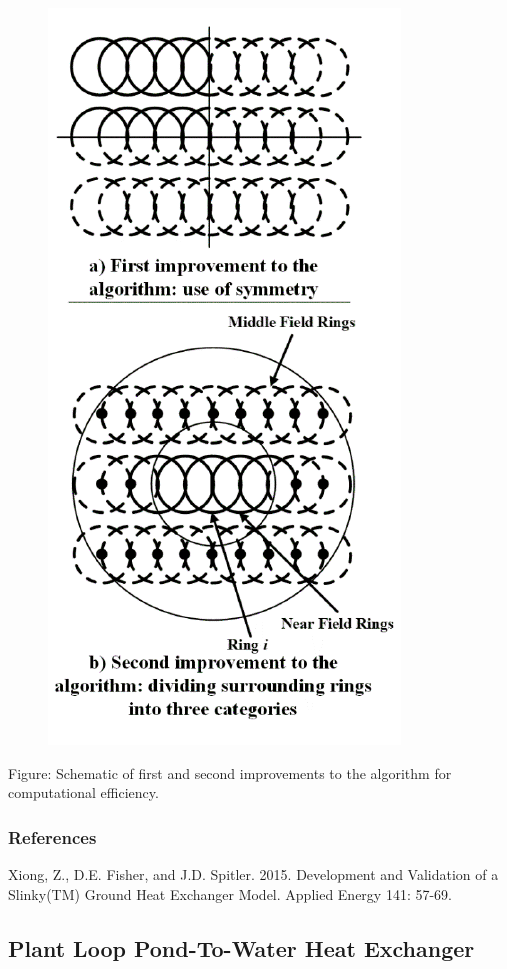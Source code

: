 \begin{figure}[htbp]
\centering
\includegraphics{media/image8001.png}
\caption{}
\end{figure}

Figure: Schematic of first and second improvements to the algorithm for computational efficiency.

\subsubsection{References}\label{references-3-003}

Xiong, Z., D.E. Fisher, and J.D. Spitler. 2015. Development and Validation of a Slinky(TM) Ground Heat Exchanger Model. Applied Energy 141: 57-69.

\subsection{Plant Loop Pond-To-Water Heat Exchanger}\label{plant-loop-pond-to-water-heat-exchanger}

